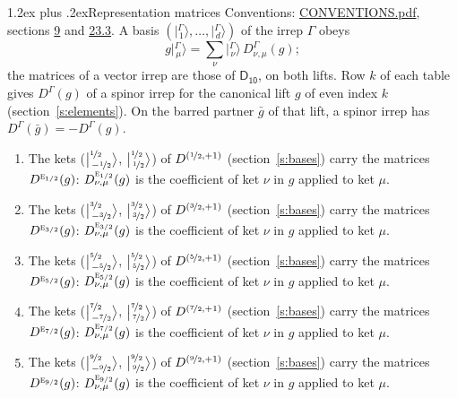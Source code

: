 \documentclass[10pt,a4paper]{article}
\makeatletter
\renewcommand\section{\@startsection{section}{1}{\z@}{-3ex plus -1ex minus -.2ex}%
  {1.2ex plus .2ex}{\normalfont\large\sffamily\bfseries\color{parttitle}}}
\numberwithin{equation}{section}
\newcommand{\grp}[1]{\mathsf{#1}}
\newcommand{\irr}[1]{\text{\normalfont\scshape #1}}
\newcommand{\irrJp}[2]{D^{(#1,#2)}}
\newcommand{\repD}[1]{D^{#1}}
\newcommand{\intx}{\mu}
\newcommand{\jm}[2]{\bigl\lvert{}^{#1}_{\,#2}\bigr\rangle}
\newcommand{\irket}[2]{\bigl\lvert{}^{#1}_{\,#2}\bigr\rangle}
\newcommand{\barred}[1]{\bar{#1}}
\newenvironment{romanlist}{\begin{enumerate}%
\renewcommand{\labelenumi}{(\roman{enumi})}}%
  {\end{enumerate}}
\makeatother
\begin{document}
\section{Representation matrices}\label{s:irrep_matrices}
Conventions: \href{../../CONVENTIONS.pdf}{CONVENTIONS.pdf}, sections \href{../../../rotation/CONVENTIONS.pdf\#conv.9}{9} and \href{../../CONVENTIONS.pdf\#conv.23.3}{23.3}.
\leavevmode\label{n:vector.ket.partner}\label{n:index.partner}\label{n:matrix.irrep}\label{n:index.partner.summed}A basis $(\irket{\Gamma}{1}, \dots, \irket{\Gamma}{d})$ of the irrep $\Gamma$ obeys
\begin{equation}\label{e:partner}g\irket{\Gamma}{\intx} = \sum_\nu \irket{\Gamma}{\nu}\, \repD{\Gamma}_{\nu,\intx}(g);\end{equation}
the matrices of a vector irrep are those of \href{../../../rotation/data/pdf/D10.pdf}{$\grp{D_{10}}$}, on both lifts. Row $k$ of each table gives $\repD{\Gamma}(g)$ of a spinor irrep for the canonical lift $g$ of even index $k$ (section~\ref{s:elements}). On the barred partner $\barred{g}$ of that lift, a spinor irrep has $\repD{\Gamma}(\barred{g}) = -\repD{\Gamma}(g)$.
\begin{romanlist}\raggedright
\item The kets ($\jm{\nicefrac{1}{2}}{-\nicefrac{1}{2}}$, $\jm{\nicefrac{1}{2}}{\nicefrac{1}{2}}$) of $\irrJp{\nicefrac{1}{2}}{+1}$ (section~\ref{s:bases}) carry the matrices $\repD{\irr{e}_{1/2}}(g)$: $\repD{\irr{e}_{1/2}}_{\nu,\intx}(g)$ is the coefficient of ket $\nu$ in $g$ applied to ket $\intx$.
\item The kets ($\jm{\nicefrac{3}{2}}{-\nicefrac{3}{2}}$, $\jm{\nicefrac{3}{2}}{\nicefrac{3}{2}}$) of $\irrJp{\nicefrac{3}{2}}{+1}$ (section~\ref{s:bases}) carry the matrices $\repD{\irr{e}_{3/2}}(g)$: $\repD{\irr{e}_{3/2}}_{\nu,\intx}(g)$ is the coefficient of ket $\nu$ in $g$ applied to ket $\intx$.
\item The kets ($\jm{\nicefrac{5}{2}}{-\nicefrac{5}{2}}$, $\jm{\nicefrac{5}{2}}{\nicefrac{5}{2}}$) of $\irrJp{\nicefrac{5}{2}}{+1}$ (section~\ref{s:bases}) carry the matrices $\repD{\irr{e}_{5/2}}(g)$: $\repD{\irr{e}_{5/2}}_{\nu,\intx}(g)$ is the coefficient of ket $\nu$ in $g$ applied to ket $\intx$.
\item The kets ($\jm{\nicefrac{7}{2}}{-\nicefrac{7}{2}}$, $\jm{\nicefrac{7}{2}}{\nicefrac{7}{2}}$) of $\irrJp{\nicefrac{7}{2}}{+1}$ (section~\ref{s:bases}) carry the matrices $\repD{\irr{e}_{7/2}}(g)$: $\repD{\irr{e}_{7/2}}_{\nu,\intx}(g)$ is the coefficient of ket $\nu$ in $g$ applied to ket $\intx$.
\item The kets ($\jm{\nicefrac{9}{2}}{-\nicefrac{9}{2}}$, $\jm{\nicefrac{9}{2}}{\nicefrac{9}{2}}$) of $\irrJp{\nicefrac{9}{2}}{+1}$ (section~\ref{s:bases}) carry the matrices $\repD{\irr{e}_{9/2}}(g)$: $\repD{\irr{e}_{9/2}}_{\nu,\intx}(g)$ is the coefficient of ket $\nu$ in $g$ applied to ket $\intx$.
\end{romanlist}
\end{document}
